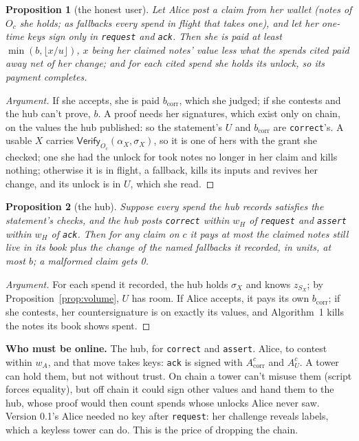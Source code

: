 \documentclass[11pt]{article}
\theoremstyle{plain}
\newtheorem{proposition}{Proposition}
\theoremstyle{definition}
\newcommand{\bcorr}{b_{\mathrm{corr}}}
\newcommand{\tx}[1]{\texttt{#1}}
\newcommand{\Vfy}{\mathsf{Verify}}
\newcommand{\Oc}{O_c}
\newcommand{\Acorr}{A_{\mathrm{corr}}^{c}}
\newcommand{\AU}{A_{U}^{c}}
\begin{document}
\begin{proposition}[the honest user]\label{prop:user}
Let Alice post a claim from her wallet (notes of $\Oc$ she holds; as
fallbacks every spend in flight that takes one), and let her one-time
keys sign only in \tx{request} and \tx{ack}. Then she is paid at least
$\min(b, \lfloor x/u \rfloor)$, $x$ being her claimed notes' value less
what the spends cited paid away net of her change; and for each cited
spend she holds its unlock, so its payment completes.
\end{proposition}
\begin{proof}[Argument]
If she accepts, she is paid $\bcorr$, which she judged; if she contests
and the hub can't prove, $b$. A proof needs her signatures, which exist
only on chain, on the values the hub published: so the statement's $U$
and $\bcorr$ are \tx{correct}'s. A usable $X$ carries $\Vfy_{\Oc}(\alpha_X,
\sigma_X)$, so it is one of hers with the grant she checked; one she had
the unlock for took notes no longer in her claim and kills nothing;
otherwise it is in flight, a fallback, kills its inputs and revives her
change, and its unlock is in $U$, which she read.
\end{proof}

\begin{proposition}[the hub]\label{prop:hub}
Suppose every spend the hub records satisfies the statement's checks,
and the hub posts \tx{correct} within $w_H$ of \tx{request} and
\tx{assert} within $w_H$ of \tx{ack}. Then for any claim on $c$ it pays
at most the claimed notes still live in its book plus the change of the
named fallbacks it recorded, in units, at most $b$; a malformed claim
gets 0.
\end{proposition}
\begin{proof}[Argument]
For each spend it recorded, the hub holds $\sigma_X$ and knows $z_{S_X}$;
by Proposition~\ref{prop:volume}, $U$ has room. If Alice accepts, it
pays its own $\bcorr$; if she contests, her countersignature is on
exactly its values, and Algorithm~1 kills the notes its book shows spent.
\end{proof}

\textbf{Who must be online.} The hub, for \tx{correct} and \tx{assert}.
Alice, to contest within $w_A$, and that move takes keys: \tx{ack} is
signed with $\Acorr$ and $\AU$. A tower can hold them, but not without
trust. On chain a tower can't misuse them (script forces equality), but
off chain it could sign other values and hand them to the hub, whose
proof would then count spends whose unlocks Alice never saw. Version
0.1's Alice needed no key after \tx{request}: her challenge reveals
labels, which a keyless tower can do. This is the price of dropping the
chain.
\end{document}
